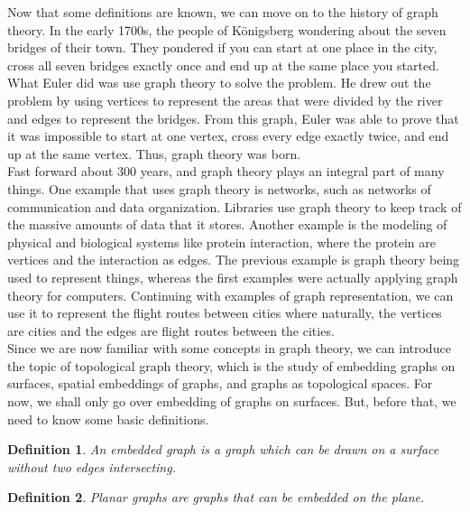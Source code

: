 \documentclass[12pt]{article}
\newtheorem{mydef}{Definition}
\newcommand{\tab}{\hspace{10mm}}
\theoremstyle{definition}
\theoremstyle{remark}
\begin{document}
\tab Now that some definitions are known, we can move on to the history of graph theory.
%
In the early 1700s, the people of K{\"o}nigsberg wondering about the seven bridges of their town.
%
They pondered if you can start at one place in the city, cross all seven bridges exactly once and end up at the same place you started.
%
What Euler did was use graph theory to solve the problem.
%
He drew out the problem by using vertices to represent the areas that were divided by the river and edges to represent the bridges.
%
From this graph, Euler was able to prove that it was impossible to start at one vertex, cross every edge exactly twice, and end up at the same vertex.
%
Thus, graph theory was born.\\
%



\tab Fast forward about 300 years, and graph theory plays an integral part of many things.
%
One example that uses graph theory is networks, such as networks of communication and data organization.
%
Libraries use graph theory to keep track of the massive amounts of data that it stores.
%
Another example is the modeling of physical and biological systems like protein interaction, where the protein are vertices and the interaction as edges.
%
The previous example is graph theory being used to represent things, whereas the first examples were actually applying graph theory for computers.
%
Continuing with examples of graph representation, we can use it to represent the flight routes between cities where naturally, the vertices are cities and the edges are flight routes between the cities.\\
%



\tab Since we are now familiar with some concepts in graph theory, we can introduce the topic of topological graph theory, which is the study of embedding graphs on surfaces, spatial embeddings of graphs, and graphs as topological spaces.
%
For now, we shall only go over embedding of graphs on surfaces.
%
But, before that, we need to know some basic definitions.
%

\begin{mydef}
An embedded graph is a graph which can be drawn on a surface without two edges intersecting.
\end{mydef}

\begin{mydef}
Planar graphs are graphs that can be embedded on the plane.
\end{mydef}
\end{document}
